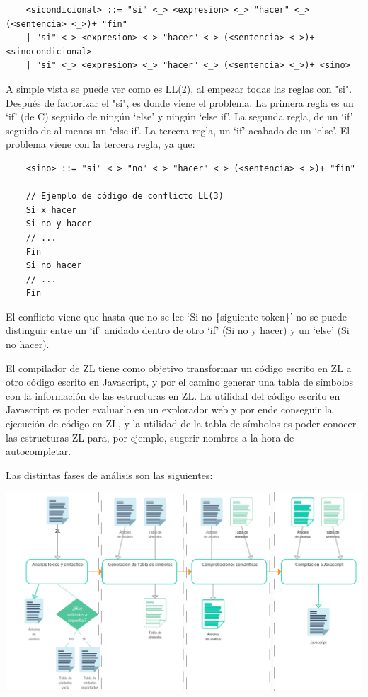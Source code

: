 \documentclass{report}
\begin{document}
	
	\begin{verbatim}
	<sicondicional> ::= "si" <_> <expresion> <_> "hacer" <_> (<sentencia> <_>)+ "fin"
	| "si" <_> <expresion> <_> "hacer" <_> (<sentencia> <_>)+ <sinocondicional>
	| "si" <_> <expresion> <_> "hacer" <_> (<sentencia> <_>)+ <sino>
	\end{verbatim}
	
	A simple vista se puede ver como es LL(2), al empezar todas las reglas con "si". Después de factorizar el "si", es donde viene el problema. La primera regla es un `if' (de C) seguido de ningún `else' y ningún `else if'. La segunda regla, de un `if' seguido de al menos un `else if'. La tercera regla, un `if' acabado de un `else'. El problema viene con la tercera regla, ya que:
	
	\vspace{10px}
	
	\begin{BVerbatim}
	<sino> ::= "si" <_> "no" <_> "hacer" <_> (<sentencia> <_>)+ "fin"
	
	// Ejemplo de código de conflicto LL(3)
	Si x hacer
	Si no y hacer
	// ...
	Fin
	Si no hacer
	// ...
	Fin
	\end{BVerbatim}
	
	\vspace{10px}
	
	El conflicto\cite{conflictoll3} viene que hasta que no se lee `Si no \{siguiente token\}' no se puede distinguir entre un `if' anidado dentro de otro `if' (Si no y hacer) y un `else' (Si no hacer).
	
	El compilador de ZL tiene como objetivo transformar un código escrito en ZL a otro código escrito en Javascript, y por el camino generar una tabla de símbolos con la información de las estructuras en ZL. La utilidad del código escrito en Javascript es poder evaluarlo en un explorador web y por ende conseguir la ejecución de código en ZL, y la utilidad de la tabla de símbolos es poder conocer las estructuras ZL para, por ejemplo, sugerir nombres a la hora de autocompletar. 
	
	\vspace{10px}
	
	Las distintas fases de análisis son las siguientes:
	
	\begin{center}
	\includegraphics[width=1\linewidth]{fasesanalisis}
	\end{center}
	
\end{document}
